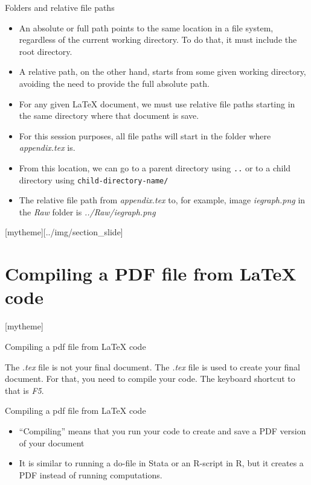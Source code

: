 \documentclass[aspectratio=169]{beamer}
\newcommand{\sectionpic}[2]{
	\setbeamertemplate{section page}[mytheme][#2]
	\section{#1}
	\setbeamertemplate{section page}[mytheme]
}
\begin{document}
\begin{frame}{Folders and relative file paths}
	\begin{itemize}
		\item An absolute or full path points to the same location in a file system, regardless of the current working directory. To do that, it must include the root directory.
		\item A relative path, on the other hand, starts from some given working directory, avoiding the need to provide the full absolute path.
		\item For any given {\LaTeX} document, we must use relative file paths starting in the same directory where that document is save.
		\item For this session purposes, all file paths will start in the folder where \textit{appendix.tex} is.
		\item From this location, we can go to a parent directory using \texttt{..} or to a child directory using \texttt{child-directory-name/}
		\item The relative file path from \textit{appendix.tex} to, for example, image \textit{iegraph.png} in the \textit{Raw} folder is \textit{../Raw/iegraph.png}
	\end{itemize}
\end{frame}

\sectionpic{Compiling a PDF file from  {\LaTeX} code}{../img/section_slide}

\begin{frame}{Compiling a pdf file from  {\LaTeX} code}
	\begin{tcolorbox}[colback=white,colframe=orange,title=\textbf{Important!}]
		The \textit{.tex} file is not your final document. The \textit{.tex} file is used to create your final document. For that, you need to compile your code. The keyboard shortcut to that is \textit{F5}.
	\end{tcolorbox}
\end{frame}

\begin{frame}{Compiling a pdf file from  {\LaTeX} code}
\begin{itemize}
	\item ``Compiling'' means that you run your code to create and save a PDF version of your document
	\item It is similar to running a do-file in Stata or an R-script in R, but it creates a PDF instead of running computations. 
\end{itemize}
\end{frame}
\end{document}
